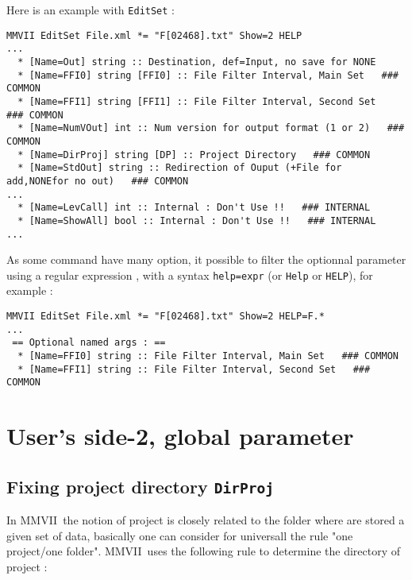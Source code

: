 \documentclass[a4paper]{book}
\newcommand{\PPP}{MMVII}
\begin{document}
Here is an example with {\tt EditSet} :

\begin{verbatim}
MMVII EditSet File.xml *= "F[02468].txt" Show=2 HELP
...
  * [Name=Out] string :: Destination, def=Input, no save for NONE
  * [Name=FFI0] string [FFI0] :: File Filter Interval, Main Set   ### COMMON 
  * [Name=FFI1] string [FFI1] :: File Filter Interval, Second Set   ### COMMON 
  * [Name=NumVOut] int :: Num version for output format (1 or 2)   ### COMMON 
  * [Name=DirProj] string [DP] :: Project Directory   ### COMMON 
  * [Name=StdOut] string :: Redirection of Ouput (+File for add,NONEfor no out)   ### COMMON 
...
  * [Name=LevCall] int :: Internal : Don't Use !!   ### INTERNAL 
  * [Name=ShowAll] bool :: Internal : Don't Use !!   ### INTERNAL 
...
\end{verbatim}

As some command have many option, it possible to filter the
optionnal parameter using a regular expression , with a
syntax {\tt help=expr} (or {\tt Help} or {\tt HELP}), for
example :


\begin{verbatim}
MMVII EditSet File.xml *= "F[02468].txt" Show=2 HELP=F.*
...
 == Optional named args : ==
  * [Name=FFI0] string :: File Filter Interval, Main Set   ### COMMON 
  * [Name=FFI1] string :: File Filter Interval, Second Set   ### COMMON 
\end{verbatim}



\section{User's side-2, global parameter}



\subsection{Fixing project directory {\tt DirProj}}

\label{Fix:Dir:Proj}

In \PPP\, the notion of  project is closely related to the folder where
are stored a given set of data, basically one can consider for universall the rule 
"one project/one folder".
\PPP\, uses the following rule to determine the directory of project  :
\end{document}
